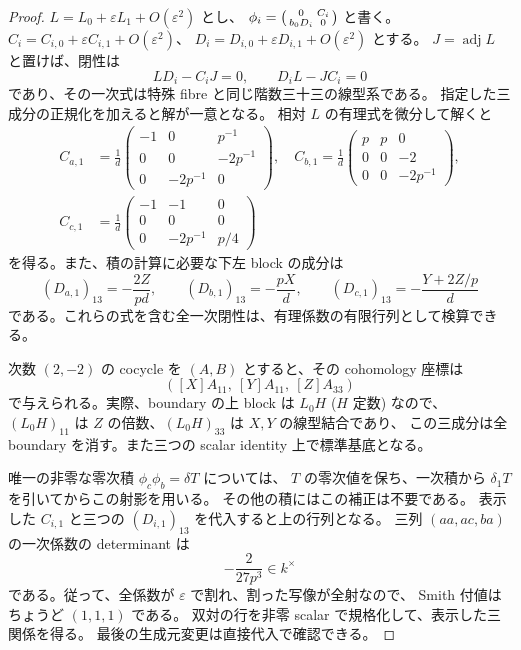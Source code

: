 \begin{proof}
$L=L_0+\varepsilon L_1+O(\varepsilon^2)$ とし、
$\phi_i=\begin{psmallmatrix}0&C_i\\b_0D_i&0\end{psmallmatrix}$ と書く。
$C_i=C_{i,0}+\varepsilon C_{i,1}+O(\varepsilon^2)$、
$D_i=D_{i,0}+\varepsilon D_{i,1}+O(\varepsilon^2)$ とする。
$J=\operatorname{adj}L$ と置けば、閉性は
\[
 LD_i-C_iJ=0,\qquad D_iL-JC_i=0
\]
であり、その一次式は特殊 fibre と同じ階数三十三の線型系である。
指定した三成分の正規化を加えると解が一意となる。
相対 $L$ の有理式を微分して解くと
\[
 \begin{aligned}
 C_{a,1}&=\frac1d\begin{pmatrix}-1&0&p^{-1}\\0&0&-2p^{-1}\\0&-2p^{-1}&0\end{pmatrix},
 \quad
 C_{b,1}=\frac1d\begin{pmatrix}p&p&0\\0&0&-2\\0&0&-2p^{-1}\end{pmatrix},\\
 C_{c,1}&=\frac1d\begin{pmatrix}-1&-1&0\\0&0&0\\0&-2p^{-1}&p/4\end{pmatrix}
 \end{aligned}
\]
を得る。また、積の計算に必要な下左 block の成分は
\[
 (D_{a,1})_{13}=-\frac{2Z}{pd},\qquad
 (D_{b,1})_{13}=-\frac{pX}{d},\qquad
 (D_{c,1})_{13}=-\frac{Y+2Z/p}{d}
\]
である。これらの式を含む全一次閉性は、有理係数の有限行列として検算できる。

次数 $(2,-2)$ の cocycle を $(A,B)$ とすると、その cohomology 座標は
\[
 ([X]A_{11},\ [Y]A_{11},\ [Z]A_{33})
\]
で与えられる。実際、boundary の上 block は $L_0H$ ($H$ 定数) なので、
$(L_0H)_{11}$ は $Z$ の倍数、$(L_0H)_{33}$ は $X,Y$ の線型結合であり、
この三成分は全 boundary を消す。また三つの scalar identity 上で標準基底となる。

唯一の非零な零次積 $\phi_c\phi_b=\delta T$ については、
$T$ の零次値を保ち、一次積から $\delta_1T$ を引いてからこの射影を用いる。
その他の積にはこの補正は不要である。
表示した $C_{i,1}$ と三つの $(D_{i,1})_{13}$ を代入すると上の行列となる。
三列 $(aa,ac,ba)$ の一次係数の determinant は
\[
 -\frac2{27p^3}\in k^\times
\]
である。従って、全係数が $\varepsilon$ で割れ、割った写像が全射なので、
Smith 付値はちょうど $(1,1,1)$ である。
双対の行を非零 scalar で規格化して、表示した三関係を得る。
最後の生成元変更は直接代入で確認できる。
\end{proof}

